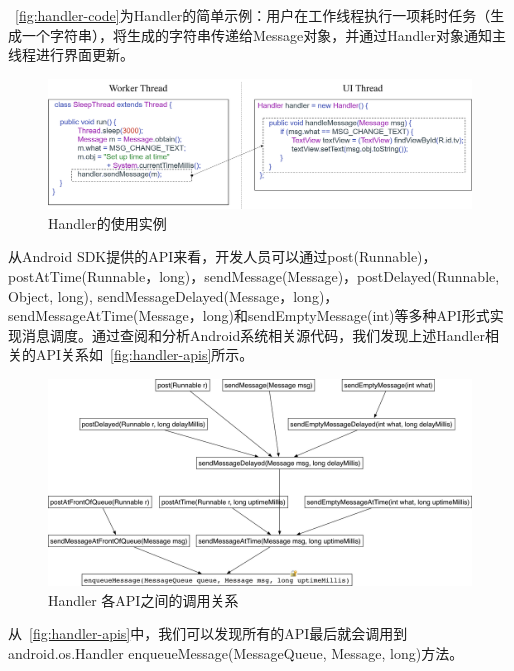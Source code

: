 ~\autoref{fig:handler-code}为Handler的简单示例：用户在工作线程执行一项耗时任务（生成一个字符串），将生成的字符串传递给Message对象，并通过Handler对象通知主线程进行界面更新。


\begin{figure}[h]
	\centering
	\includegraphics[width=\textwidth]{./Figures/handler-code.png}
	\caption{Handler的使用实例}
	\label{fig:handler-code}
\end{figure}


从Android SDK提供的API来看，开发人员可以通过post(Runnable)，postAtTime(Runnable，long)，sendMessage(Message)，postDelayed(Runnable, Object, long), sendMessageDelayed(Message，long)，sendMessageAtTime(Message，long)和sendEmptyMessage(int)等多种API形式实现消息调度。通过查阅和分析Android系统相关源代码，我们发现上述Handler相关的API关系如~\autoref{fig:handler-apis}所示。


\begin{figure}[h]
	\centering
	\includegraphics[width=\textwidth]{./Figures/Handler-apis.png}
	\caption{ Handler 各API之间的调用关系}
	\label{fig:handler-apis}
\end{figure}


从~\autoref{fig:handler-apis}中，我们可以发现所有的API最后就会调用到android.os.Handler enqueueMessage(MessageQueue, Message, long)方法。

